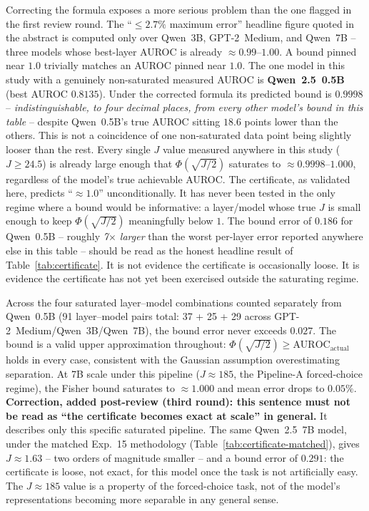 \documentclass[10pt,twocolumn]{article}
\begin{document}
Correcting the formula exposes a more serious problem than the one
flagged in the first review round. The ``$\leq 2.7\%$ maximum error''
headline figure quoted in the abstract is computed only over Qwen~3B,
GPT-2~Medium, and Qwen~7B -- three models whose best-layer AUROC is
already ${\approx}0.99$--$1.00$. A bound pinned near $1.0$ trivially
matches an AUROC pinned near $1.0$. The one model in this study with a
genuinely non-saturated measured AUROC is \textbf{Qwen~2.5~0.5B} (best
AUROC $0.8135$). Under the corrected formula its predicted bound is
$\mathbf{0.9998}$ -- \emph{indistinguishable, to four decimal places,
from every other model's bound in this table} -- despite Qwen~0.5B's
true AUROC sitting $18.6$ points lower than the others. This is not a
coincidence of one non-saturated data point being slightly looser than
the rest. Every single $J$ value measured anywhere in this study
($J \geq 24.5$) is already large enough that $\Phi(\sqrt{J/2})$
saturates to ${\approx}0.9998$--$1.000$, regardless of the model's true
achievable AUROC. The certificate, as validated here, predicts
``${\approx}1.0$'' unconditionally. It has never been tested in the
only regime where a bound would be informative: a layer/model whose
true $J$ is small enough to keep $\Phi(\sqrt{J/2})$ meaningfully below
$1$. The bound error of $\mathbf{0.186}$ for Qwen~0.5B -- roughly
\emph{7$\times$ larger} than the worst per-layer error reported anywhere
else in this table -- should be read as the honest headline result of
Table~\ref{tab:certificate}. It is not evidence the certificate is
occasionally loose. It is evidence the certificate has not yet been
exercised outside the saturating regime.

Across the four saturated layer--model combinations counted separately
from Qwen~0.5B (91 layer--model pairs total: 37 + 25 + 29 across
GPT-2~Medium/Qwen~3B/Qwen~7B), the bound error never exceeds $0.027$.
The bound is a valid upper approximation throughout:
$\Phi(\sqrt{J/2}) \geq \text{AUROC}_\text{actual}$ holds in every case,
consistent with the Gaussian assumption overestimating separation. At 7B
scale under this pipeline ($J \approx 185$, the Pipeline-A forced-choice
regime), the Fisher bound saturates to $\approx 1.000$ and mean error
drops to $0.05\%$. \textbf{Correction, added post-review (third round):
this sentence must not be read as ``the certificate becomes exact at
scale'' in general.} It describes only this specific saturated
pipeline. The same Qwen~2.5~7B model, under the matched Exp.~15
methodology (Table~\ref{tab:certificate-matched}), gives $J \approx
1.63$ -- two orders of magnitude smaller -- and a bound error of
$0.291$: the certificate is loose, not exact, for this model once the
task is not artificially easy. The $J\approx185$ value is a property of
the forced-choice task, not of the model's representations becoming
more separable in any general sense.
\end{document}
